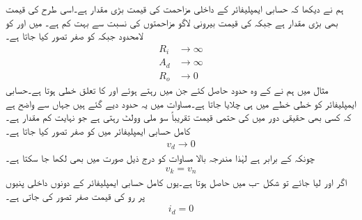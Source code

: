 ہم نے دیکھا کہ حسابی ایمپلیفائر کے داخلی مزاحمت  کی قیمت بڑی مقدار ہے۔اسی طرح  کی قیمت بھی بڑی مقدار ہے جبکہ  کی قیمت بیرونی لاگو مزاحمتوں کی نسبت سے بہت کم ہے۔ میں  اور  کو لامحدود جبکہ  کو صفر  تصور کیا جاتا ہے۔
\begin{align}
R_i& \to \infty \label{مساوات_حسابی_کامل_شرط_الف}\\
A_d& \to \infty  \label{مساوات_حسابی_کامل_شرط_ب}\\
R_o& \to 0  \label{مساوات_حسابی_کامل_شرط_پ}
\end{align}
مثال  میں ہم نے  کے وہ حدود حاصل کئے جن میں رہتے ہوئے  اور  کا تعلق خطی ہوتا ہے۔حسابی ایمپلیفائر کو خطی خطے میں ہی چلایا جاتا ہے۔مساوات  میں یہ حدود دیے گئے ہیں جہاں سے واضح ہے کہ کسی بھی حقیقی دور میں   کی حتمی قیمت تقریباً سو ملی وولٹ رہتی ہے جو نہایت کم مقدار ہے۔کامل حسابی ایمپلیفائر میں  کو صفر تصور کیا جاتا ہے۔
\begin{align}\label{مساوات_حسابی_کامل_شرط_ت}
v_d \to 0  
\end{align}
چونکہ  کے برابر ہے لہٰذا مندرجہ بالا مساوات کو درج ذیل صورت میں بھی لکھا جا سکتا ہے۔
\begin{align}\label{مساوات_حسابی_کامل_شرط_ٹ}
v_k=v_n
\end{align}
اگر  اور {} لیا جائے تو شکل -ب میں  حاصل ہوتا ہے۔یوں کامل حسابی ایمپلیفائر کے دونوں داخلی پنیوں پر رو کی قیمت صفر تصور کی جاتی ہے۔
\begin{align}\label{مساوات_حسابی_کامل_شرط_ث}
i_d=0
\end{align}

